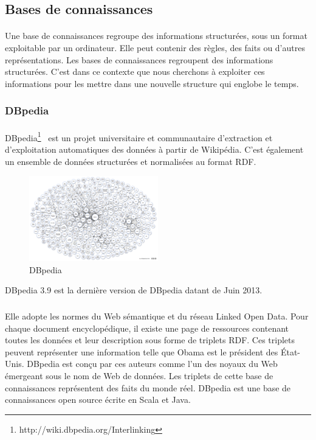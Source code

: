 \subsection{Bases de connaissances}
\paragraph{}
Une base de connaissances regroupe des informations structurées, sous un format exploitable par un ordinateur. Elle peut contenir des règles, des faits ou d'autres représentations. Les bases de connaissances regroupent des informations structurées. C’est dans ce contexte que nous cherchons à exploiter ces informations pour les mettre dans une nouvelle structure qui englobe le temps.
\subsubsection{DBpedia}
\paragraph{}
DBpedia\footnote{http://wiki.dbpedia.org/Interlinking}~\cite{lehmann2014} est un projet universitaire et communautaire d’extraction et d’exploitation automatiques des données à partir de Wikipédia. C’est également un ensemble de données structurées et normalisées au format RDF.
\begin{figure}
\vspace{-10pt}
\begin{center}
\includegraphics[width=0.50\textwidth]{dbpedia.png}
\end{center}
\vspace{-15pt}
\caption{DBpedia}
\vspace{-10pt}
\end{figure}
DBpedia 3.9 est la dernière version de DBpedia datant de Juin 2013.
\subparagraph{}
Elle adopte les normes du Web sémantique et du réseau Linked Open Data. Pour chaque document encyclopédique, il existe une page de ressources contenant toutes les données et leur description sous forme de triplets RDF. Ces triplets peuvent représenter une information telle que Obama est le président des État-Unis.
DBpedia est conçu par ces auteurs comme l'un des noyaux du Web émergeant sous le nom de Web de données. Les triplets de cette base de connaissances représentent des faits du monde réel. DBpedia est une base de connaissances open source écrite en Scala et Java.
\newpage
